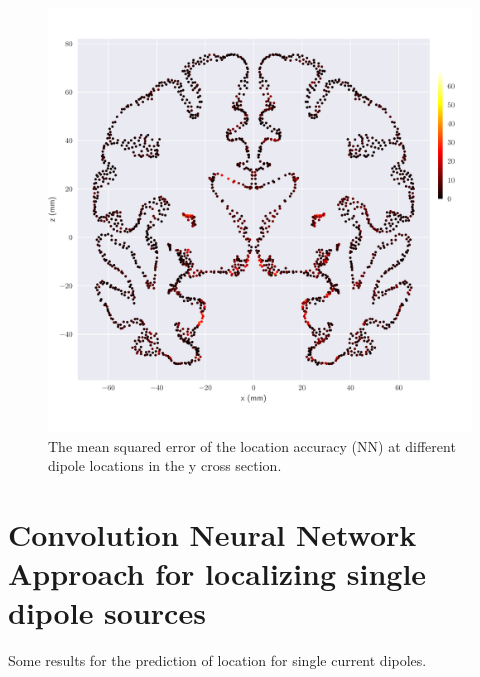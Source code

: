 \documentclass[a4paper, UKenglish, 11pt]{uiomaster}
\begin{document}
\begin{figure}[!htb]
    \centering
    \includegraphics[width=\linewidth]{../Code/plots/finals/mse_y_plane.pdf}
    \caption{The mean squared error of the location accuracy (NN) at different dipole locations
    in the y cross section.}
    \label{fig:single_dipole_accuracy}
\end{figure}



\section{Convolution Neural Network Approach for localizing single dipole sources}

Some results for the prediction of location for single current dipoles.
\end{document}
